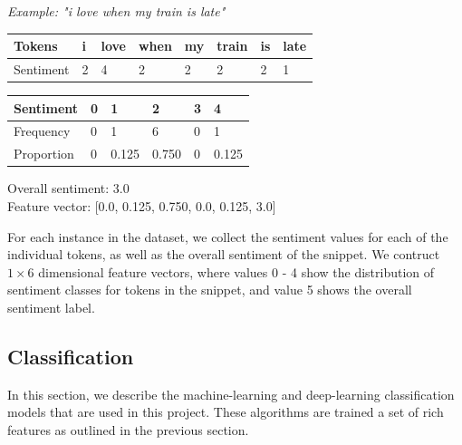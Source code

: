 \documentclass[12pt,a4paper]{article}
\begin{document}
\hspace{-15pt}\begin{minipage}{0.55\textwidth}
	\textit{Example: "i love when my train is late"}\vspace{-15pt}
	\begin{center}	
		\begin{tabular}{|m{1.8cm}||m{0.4cm}m{0.6cm}m{0.75cm}m{0.4cm}m{0.7cm}m{0.2cm}m{0.6cm}|}
			\hline 
			\textbf{Tokens} & \textbf{i} & \textbf{love} & \textbf{when} & \textbf{my} & \textbf{train} & \textbf{is} & \textbf{late}\\ 
			\hline 
			Sentiment & 2 & 4 & 2 & 2 & 2 & 2 & 1\\ 
			\hline 
		\end{tabular}
		\vspace{5pt}
		
		\begin{tabular}{|p{1.8cm}||p{0.9cm}|p{0.9cm}|p{0.9cm}|p{0.9cm}|p{0.9cm}|} 
			\hline 
			\textbf{Sentiment} & \textbf{0} & \textbf{1} & \textbf{2} & \textbf{3} & \textbf{4}\\ 
			\hline 
			Frequency & 0 & 1 & 6 & 0 & 1\\ 
			Proportion & 0 & 0.125 & 0.750 & 0 & 0.125\\
			\hline  
		\end{tabular}
	\end{center}
	Overall sentiment: 3.0\\
	Feature vector: [0.0, 0.125, 0.750, 0.0, 0.125, 3.0]\\
\end{minipage}
\hspace{15pt}\begin{minipage}{0.4\textwidth}
	\vspace{-5pt}
	For each instance in the dataset, we collect the sentiment values for each of the individual tokens, as well as the overall sentiment of the snippet. We contruct $ 1 \times 6 $ dimensional feature vectors, where values 0 - 4 show the distribution of sentiment classes for tokens in the snippet, and value 5 shows the overall sentiment label.\\
\end{minipage}



\subsection{Classification}
\noindent 
In this section, we describe the machine-learning and deep-learning classification models that are used in this project. These algorithms are trained a set of rich features as outlined in the previous section.
\end{document}
